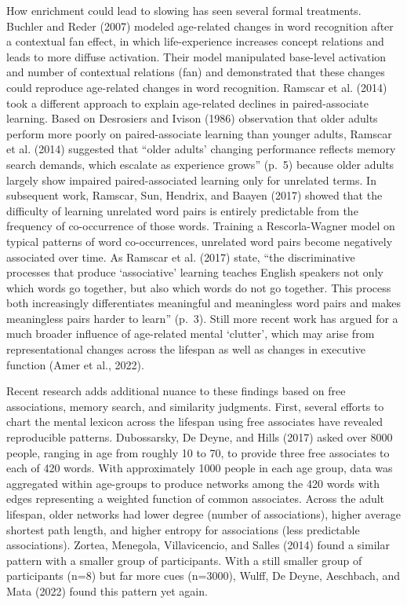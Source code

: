 \documentclass[
  man]{apa6}
\begin{document}
How enrichment could lead to slowing has seen several formal treatments. Buchler and Reder (2007) modeled age-related changes in word recognition after a contextual fan effect, in which life-experience increases concept relations and leads to more diffuse activation. Their model manipulated base-level activation and number of contextual relations (fan) and demonstrated that these changes could reproduce age-related changes in word recognition. Ramscar et al. (2014) took a different approach to explain age-related declines in paired-associate learning. Based on Desrosiers and Ivison (1986) observation that older adults perform more poorly on paired-associate learning than younger adults, Ramscar et al. (2014) suggested that ``older adults' changing performance reflects memory search demands, which escalate as experience grows'' (p.~5) because older adults largely show impaired paired-associated learning only for unrelated terms. In subsequent work, Ramscar, Sun, Hendrix, and Baayen (2017) showed that the difficulty of learning unrelated word pairs is entirely predictable from the frequency of co-occurrence of those words. Training a Rescorla-Wagner model on typical patterns of word co-occurrences, unrelated word pairs become negatively associated over time. As Ramscar et al. (2017) state, ``the discriminative processes that produce `associative' learning teaches English speakers not only which words go together, but also which words do not go together. This process both increasingly differentiates meaningful and meaningless word pairs and makes meaningless pairs harder to learn'' (p.~3). Still more recent work has argued for a much broader influence of age-related mental `clutter', which may arise from representational changes across the lifespan as well as changes in executive function (Amer et al., 2022).

Recent research adds additional nuance to these findings based on free associations, memory search, and similarity judgments. First, several efforts to chart the mental lexicon across the lifespan using free associates have revealed reproducible patterns. Dubossarsky, De Deyne, and Hills (2017) asked over 8000 people, ranging in age from roughly 10 to 70, to provide three free associates to each of 420 words. With approximately 1000 people in each age group, data was aggregated within age-groups to produce networks among the 420 words with edges representing a weighted function of common associates. Across the adult lifespan, older networks had lower degree (number of associations), higher average shortest path length, and higher entropy for associations (less predictable associations). Zortea, Menegola, Villavicencio, and Salles (2014) found a similar pattern with a smaller group of participants. With a still smaller group of participants (n=8) but far more cues (n=3000), Wulff, De Deyne, Aeschbach, and Mata (2022) found this pattern yet again.
\end{document}
